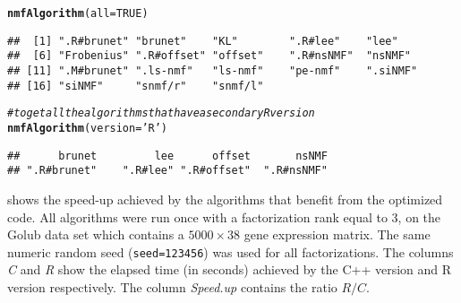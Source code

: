 \documentclass[a4paper]{article}\usepackage[]{graphicx}\usepackage[]{color}
\makeatletter
\newcommand{\hlnum}[1]{\textcolor[rgb]{0.686,0.059,0.569}{#1}}%
\newcommand{\hlstr}[1]{\textcolor[rgb]{0.192,0.494,0.8}{#1}}%
\newcommand{\hlcom}[1]{\textcolor[rgb]{0.678,0.584,0.686}{\textit{#1}}}%
\newcommand{\hlstd}[1]{\textcolor[rgb]{0.345,0.345,0.345}{#1}}%
\newcommand{\hlkwc}[1]{\textcolor[rgb]{0.333,0.667,0.333}{#1}}%
\newcommand{\hlkwd}[1]{\textcolor[rgb]{0.737,0.353,0.396}{\textbf{#1}}}%
\newenvironment{kframe}{%
 \def\at@end@of@kframe{}%
 \ifinner\ifhmode%
  \def\at@end@of@kframe{\end{minipage}}%
  \begin{minipage}{\columnwidth}%
 \fi\fi%
 \def\FrameCommand##1{\hskip\@totalleftmargin \hskip-\fboxsep
 \colorbox{shadecolor}{##1}\hskip-\fboxsep
     \hskip-\linewidth \hskip-\@totalleftmargin \hskip\columnwidth}%
 \MakeFramed {\advance\hsize-\width
   \@totalleftmargin\z@ \linewidth\hsize
   \@setminipage}}%
 {\par\unskip\endMakeFramed%
 \at@end@of@kframe}
\newenvironment{knitrout}{}{} %
\let\code=\texttt
\makeatother
\begin{document}
\begin{knitrout}
\color{fgcolor}\begin{kframe}
\begin{alltt}
\hlkwd{nmfAlgorithm}\hlstd{(}\hlkwc{all}\hlstd{=}\hlnum{TRUE}\hlstd{)}
\end{alltt}
\begin{verbatim}
##  [1] ".R#brunet" "brunet"    "KL"        ".R#lee"    "lee"      
##  [6] "Frobenius" ".R#offset" "offset"    ".R#nsNMF"  "nsNMF"    
## [11] ".M#brunet" ".ls-nmf"   "ls-nmf"    "pe-nmf"    ".siNMF"   
## [16] "siNMF"     "snmf/r"    "snmf/l"
\end{verbatim}
\begin{alltt}
\hlcom{# to get all the algorithms that have a secondary R version}
\hlkwd{nmfAlgorithm}\hlstd{(}\hlkwc{version}\hlstd{=}\hlstr{'R'}\hlstd{)}
\end{alltt}
\begin{verbatim}
##      brunet         lee      offset       nsNMF 
## ".R#brunet"    ".R#lee" ".R#offset"  ".R#nsNMF"
\end{verbatim}
\end{kframe}
\end{knitrout}

 shows the speed-up achieved by the algorithms that benefit from the optimized code.
All algorithms were run once with a factorization rank equal to 3, on the Golub data set which contains a $5000\times 38$ gene expression matrix. 
The same numeric random seed (\code{seed=123456}) was used for all factorizations.
The columns \emph{C} and \emph{R} show the elapsed time (in seconds) achieved by the C++ version and R version respectively.
The column \emph{Speed.up} contains the ratio $R/C$. 
\end{document}
